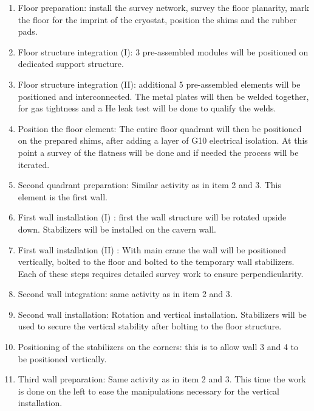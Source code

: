 \begin{enumerate}

\item Floor preparation: install the survey network, survey the floor planarity, mark
the floor for the imprint of the cryostat, position the shims and the rubber pads.

\item Floor structure integration (I): 3 pre-assembled modules will be positioned
on dedicated support structure.

\item Floor structure integration (II): additional 5 pre-assembled elements will be positioned and interconnected. The metal plates will then be welded together, for gas tightness and a He leak test will be done to qualify the welds.

\item Position the floor element: The entire floor quadrant will then be positioned on the prepared shims, after adding a layer of G10 electrical isolation. At this point a survey of the flatness will be done and if needed the process will be iterated.

\item Second quadrant preparation: Similar activity as in item  2 and 3. This element is the first wall.

\item First wall installation (I) : first the wall structure will be rotated upside down. Stabilizers will be installed on the cavern wall.
 
\item First wall installation (II) : With main crane the wall will be positioned vertically, bolted to the floor and bolted to the temporary wall stabilizers. Each of these steps requires detailed survey work to ensure perpendicularity.
 
\item Second wall integration: same activity as in item 2 and 3.
 
\item Second wall installation: Rotation and vertical installation. Stabilizers will be used to secure the vertical stability after bolting to the floor structure.

\item Positioning of the stabilizers on the corners: this is to allow wall 3 and 4 to be positioned vertically.
 
\item Third wall preparation: Same activity as in item 2 and 3. This time the work is done on the left to ease the manipulations necessary for the vertical installation.


\end{enumerate}
